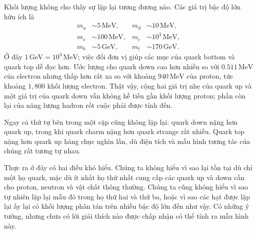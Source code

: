 Khối lượng không cho thấy sự lặp lại tương đương nào. Các giá trị bậc độ lớn hữu ích là
\begin{align}
m_u &\sim 5\,\mathrm{MeV},
&
m_d &\sim 10\,\mathrm{MeV},
\\
m_s &\sim 100\,\mathrm{MeV},
&
m_c &\sim 10^3\,\mathrm{MeV},
\\
m_b &\sim 5\,\mathrm{GeV},
&
m_t &\sim 170\,\mathrm{GeV}.
\end{align}
Ở đây \(1\,\mathrm{GeV}=10^3\,\mathrm{MeV}\); việc đổi đơn vị giúp các mục của quark bottom và quark top dễ đọc hơn. Ước lượng cho quark down cao hơn nhiều so với \(0.511\,\mathrm{MeV}\) của electron nhưng thấp hơn rất xa so với khoảng \(940\,\mathrm{MeV}\) của proton, tức khoảng \(1{,}800\) khối lượng electron. Thật vậy, cộng hai giá trị nhẹ của quark up và một giá trị của quark down vẫn không hề tiến gần khối lượng proton; phần còn lại của năng lượng hadron rốt cuộc phải được tính đến.


Ngay cả thứ tự bên trong một cặp cũng không lặp lại: quark down nặng hơn quark up, trong khi quark charm nặng hơn quark strange rất nhiều. Quark top nặng hơn quark up hàng chục nghìn lần, dù điện tích và mẫu hình tương tác của chúng rất tương tự nhau.

Thực ra ở đây có hai điều khó hiểu. Chúng ta không hiểu vì sao lại tồn tại dù chỉ một họ quark, mặc dù ít nhất họ thứ nhất cung cấp các quark up và down cần cho proton, neutron và vật chất thông thường. Chúng ta cũng không hiểu vì sao tự nhiên lặp lại mẫu đó trong họ thứ hai và thứ ba, hoặc vì sao các hạt được lặp lại ấy lại có khối lượng phân tán trên nhiều bậc độ lớn đến như vậy. Có những ý tưởng, nhưng chưa có lời giải thích nào được chấp nhận có thể tính ra mẫu hình này.

\begin{classroomqa}
\end{classroomqa}

